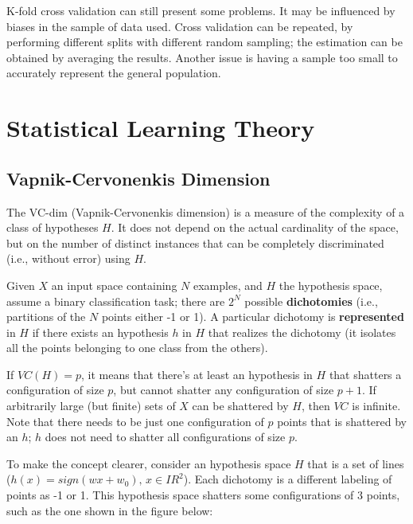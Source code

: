 K-fold cross validation can still present some problems. It may be influenced by biases in the sample of data used. Cross validation can be repeated, by performing different splits with different random sampling; the estimation can be obtained by averaging the results. Another issue is having a sample too small to accurately represent the general population.

\section{Statistical Learning Theory}

\subsection{Vapnik-Cervonenkis Dimension}

The VC-dim (Vapnik-Cervonenkis dimension) is a measure of the complexity of a class of hypotheses $H$. It does not depend on the actual cardinality of the space, but on the number of distinct instances that can be completely discriminated (i.e., without error) using $H$.

Given $X$ an input space containing $N$ examples, and $H$ the hypothesis space, assume a binary classification task; there are $2^N$ possible \textbf{dichotomies} (i.e., partitions of the $N$ points either -1 or 1). A particular dichotomy is \textbf{represented} in $H$ if there exists an hypothesis $h$ in $H$ that realizes the dichotomy (it isolates all the points belonging to one class from the others).



If $VC(H) = p$, it means that there's at least an hypothesis in $H$ that shatters a configuration of size $p$, but cannot shatter any configuration of size $p+1$. If arbitrarily large (but finite) sets of $X$ can be shattered by $H$, then $VC$ is infinite. Note that there needs to be just one configuration of $p$ points that is shattered by an $h$; $h$ does not need to shatter all configurations of size $p$.

To make the concept clearer, consider an hypothesis space $H$ that is a set of lines ($h(x) = sign(wx + w_0) , \, x \in IR^2$). Each dichotomy is a different labeling of points as -1 or 1. This hypothesis space shatters some configurations of 3 points, such as the one shown in the figure below:

